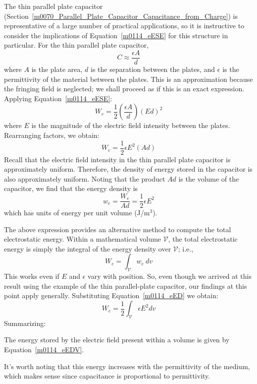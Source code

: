 
The thin parallel plate capacitor (Section~\ref{m0070_Parallel_Plate_Capacitor_Capacitance_from_Charge}) is representative of a large number of practical applications, so it is instructive to consider the implications of Equation~\ref{m0114_eESE} for this structure in particular.
For the thin parallel plate capacitor,
%
\begin{equation}
C \approx \frac{\epsilon A}{d}
\end{equation}
%
where $A$ is the plate area, $d$ is the separation between the plates, and $\epsilon$ is the permittivity of the material between the plates.
This is an approximation because the fringing field is neglected; we shall proceed as if this is an exact expression.
Applying Equation~\ref{m0114_eESE}:
%
\begin{equation}
W_e = \frac{1}{2} \left(\frac{\epsilon A}{d}\right)\left(Ed\right)^2 
\end{equation}
%
where $E$ is the magnitude of the electric field intensity between the plates.
Rearranging factors, we obtain:
%
\begin{equation}
W_e = \frac{1}{2} \epsilon E^2 \left(A d\right) 
\end{equation}
%
Recall that the electric field intensity in the thin parallel plate capacitor is approximately uniform.
Therefore, the density of energy stored in the capacitor is also approximately uniform.
Noting that the product $Ad$ is the volume of the capacitor, we find that the energy density is
%
\begin{equation}
w_e = \frac{W_e}{Ad} = \frac{1}{2} \epsilon E^2 
\label{m0114_eED}
\end{equation}
%
which has units of energy per unit volume (J/m$^3$).

The above expression provides an alternative method to compute the total electrostatic energy.
Within a mathematical volume ${\mathcal V}$, the total electrostatic energy is simply the integral of the energy density over ${\mathcal V}$; i.e., 
%
\begin{equation}
W_e = \int_{\mathcal V} w_e~dv  
\end{equation}
%
This works even if $E$ and $\epsilon$ vary with position. 
So, even though we arrived at this result using the example of the thin parallel-plate capacitor, our findings at this point apply generally.
Substituting Equation~\ref{m0114_eED} we obtain:
%
\begin{equation}
\boxed{
W_e = \frac{1}{2} \int_{\mathcal V} \epsilon E^2 dv  
}
\label{m0114_eEDV}
\end{equation}
%
Summarizing:
%
\begin{mdframed}[backgroundcolor=yellow!20,nobreak=true] 
The energy stored by the electric field present within a volume is given by Equation~\ref{m0114_eEDV}.
\end{mdframed}
%
It's worth noting that this energy increases with the permittivity of the medium, which makes sense since capacitance is proportional to permittivity.


